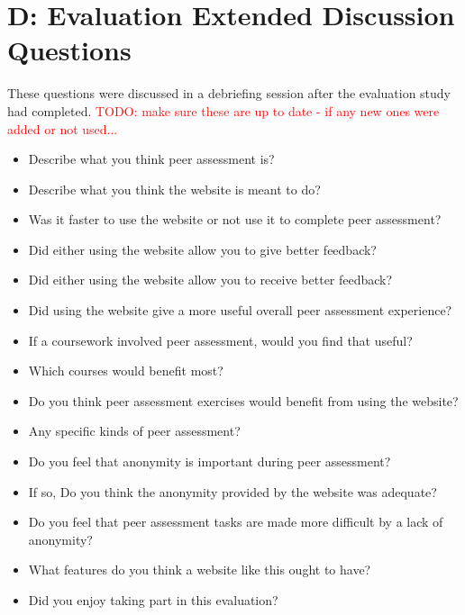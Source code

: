 \documentclass[a4paper,11pt]{report}
\newcommand{\todo}[1]{\textcolor{red}{TODO: #1}}
\begin{document}
\newpage
{}











\newpage
{}
\section*{D: Evaluation Extended Discussion Questions}
These questions were discussed in a debriefing session after the evaluation study had completed. \todo{make sure these are up to date - if any new ones were added or not used...}\par
\begin{itemize}
\item Describe what you think peer assessment is?
\item Describe what you think the website is meant to do?
\vspace{1cm}
\item Was it faster to use the website or not use it to complete peer assessment?
\item Did either using the website allow you to give better feedback?
\item Did either using the website allow you to receive better feedback?
\item Did using the website give a more useful overall peer assessment experience?
\vspace{1cm}
\item If a coursework involved peer assessment, would you find that useful?
\item Which courses would benefit most?
\vspace{1cm}
\item Do you think peer assessment exercises would benefit from using the website?
\item Any specific kinds of peer assessment?
\vspace{1cm}
\item Do you feel that anonymity is important during peer assessment?
\item If so, Do you think the anonymity provided by the website was adequate?
\item Do you feel that peer assessment tasks are made more difficult by a lack of anonymity?
\vspace{1cm}
\item What features do you think a website like this ought to have?
\vspace{1cm}
\item Did you enjoy taking part in this evaluation?
\end{itemize}
\end{document}

